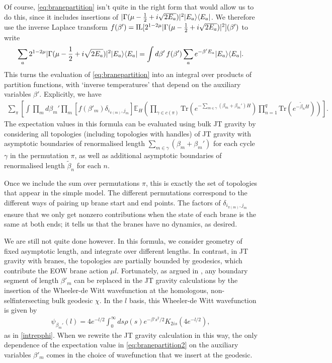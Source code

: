 \documentclass[12pt]{article}
\renewcommand{\tilde}{\widetilde}
\numberwithin{equation}{section}
\def\Tr{\text{Tr}}
\begin{document}
Of course, \eqref{eq:branepartition} isn't quite in the right form that would allow us to do this, since it includes insertions of $|\Gamma(\mu-{1\over 2}+i\sqrt{2 E_a})|^2 |E_a \rangle\langle E_a|$. We therefore use the inverse Laplace transform $f (\beta') =\text{IL}[2^{1 - 2\mu} |\Gamma(\mu-{1\over 2}+i\sqrt{2 E_a})|^2](\beta')$ to write
\begin{align}
\sum_a 2^{1-2 \mu} |\Gamma(\mu-{1\over 2}+i\sqrt{2 E_a})|^2 |E_a \rangle\langle E_a| = \int d \beta'  \,f(\beta') \sum_a e^{-\beta' E_a}   |E_a \rangle\langle E_a|.
\end{align}
This turns the evaluation of \eqref{eq:branepartition}  into an integral over products of partition functions, with `inverse temperatures' that depend on the auxiliary variables $\beta'$. Explicitly, we have
\begin{align} \label{eq:branepartition2}
\sum_\pi \left[\int \prod_{m} d\beta_m' \prod_{m}[ f(\beta'_m) \delta_{i_{\pi(m)},j_m}]  \mathbb{E}_H \left(\prod_{\gamma \in c(\pi)} \Tr\left(e^{- \sum_{m \in \gamma} (\beta_m + \beta_m') H}\right) \prod_{n=1}^q \Tr(e^{- \tilde{\beta}_n H}) \right)\right].
\end{align}
The expectation values in this formula can be evaluated using bulk JT gravity by considering all topologies (including topologies with handles) of JT gravity with asymptotic boundaries of renormalised length $\sum_{m \in \gamma} (\beta_m + \beta_m')$ for each cycle $\gamma$ in the permutation $\pi$, as well as additional asymptotic boundaries of renormalised length $\tilde{\beta}_n$ for each $n$.

Once we include the sum over permutations $\pi$, this is exactly the set of topologies that appear in the simple model. The different permutations correspond to the different ways of pairing up brane start and end points. The factors of $\delta_{i_{\pi(m)},j_m}$ ensure that we only get nonzero contributions when the state of each brane is the same at both ends; it tells us that the branes have no dynamics, as desired. 

We are still not quite done however. In this formula, we consider geometry of fixed asymptotic length, and integrate over different lengths. In contrast, in JT gravity with branes, the topologies are partially bounded by geodesics, which contribute the EOW brane action $\mu l$. Fortunately, as argued in \cite{Yang:2018gdb,Saad:2019pqd}, any boundary segment of length $\beta'_m$ can be replaced in the JT gravity calculations by the insertion of the Wheeler-de Witt wavefunction at the homologous, non-selfintersecting bulk geodesic $\chi$. In the $l$ basis, this Wheeler-de Witt wavefunction is given by
\begin{align}
\psi_{\beta_m'} (l) = 4 e^{-l/2} \int_0^\infty ds \rho(s) e^{- \beta' s^2/2} K_{2 i s} (4e^{-l/2}),
\end{align}
as in \eqref{intrepphi}. When we rewrite the JT gravity calculation in this way, the only dependence of the expectation value in  \eqref{eq:branepartition2} on the auxiliary variables $\beta'_m$ comes in the choice of wavefunction that we insert at the geodesic.
\end{document}
